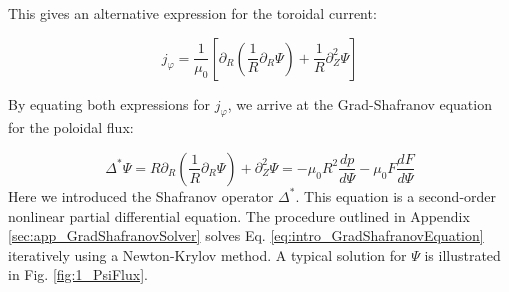 This gives an alternative expression for the toroidal current:

\begin{equation}
	j_\varphi = \frac{1}{\mu_0}\left[\partial_R\left(\frac{1}{R}\partial_R\Psi\right) + \frac{1}{R}\partial_Z^2\Psi\right]
\end{equation}

By equating both expressions for $j_\varphi$, we arrive at the Grad-Shafranov equation\cite{grad1958hydromagnetic,shafranov1957equilibrium} for the poloidal flux:

\begin{equation}
	\label{eq:intro_GradShafranovEquation}
	\Delta^* \Psi = R\partial_R\left(\frac{1}{R}\partial_R\Psi\right) + \partial_Z^2\Psi = -\mu_0R^2\frac{dp}{d\Psi} - \mu_0 F \frac{dF}{d\Psi}
\end{equation}
Here we introduced the Shafranov operator $\Delta^*$.
This equation is a second-order nonlinear partial differential equation. The procedure outlined in Appendix \ref{sec:app_GradShafranovSolver} solves Eq. \ref{eq:intro_GradShafranovEquation} iteratively using a Newton-Krylov method. A typical solution for $\Psi$ is illustrated in Fig. \ref{fig:1_PsiFlux}.

